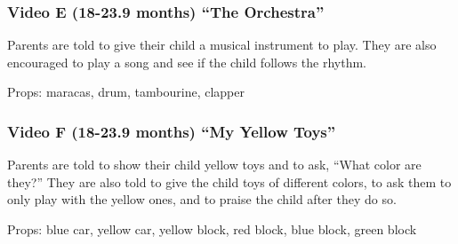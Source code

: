 \documentclass[man,floatsintext]{apa6}
\begin{document}
\begin{appendix}
{\subsubsection{Video E (18-23.9 months) ``The
Orchestra''}\label{video-e-18-23.9-months-the-orchestra}}

Parents are told to give their child a musical instrument to play. They
are also encouraged to play a song and see if the child follows the
rhythm.

Props: maracas, drum, tambourine, clapper

\hypertarget{video-f-18-23.9-months-my-yellow-toys}{%
\subsubsection{Video F (18-23.9 months) ``My Yellow
Toys''}\label{video-f-18-23.9-months-my-yellow-toys}}

Parents are told to show their child yellow toys and to ask, ``What
color are they?'' They are also told to give the child toys of different
colors, to ask them to only play with the yellow ones, and to praise the
child after they do so.

Props: blue car, yellow car, yellow block, red block, blue block, green
block
\end{appendix}
\end{document}
